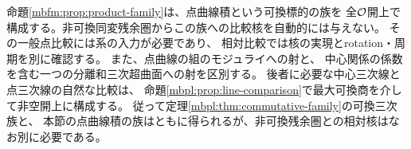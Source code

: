 \begin{remark}[点曲線積と残余比較]
\label{mbfm:rem:comparison-boundary}
命題\ref{mbfm:prop:product-family}は、点曲線積という可換標的の族を
全$\mathcal O$開上で構成する。非可換同変残余圏からこの族への比較核を自動的には与えない。
その一般点比較には系の入力が必要であり、
相対比較では核の実現とrotation・周期を別に確認する。
また、点曲線の組のモジュライへの射と、
中心関係の係数を含む一つの分離和三次超曲面への射を区別する。
後者に必要な中心三次線と点三次線の自然な比較は、
命題\ref{mbpl:prop:line-comparison}で最大可換商を介して非空開上に構成する。
従って定理\ref{mbpl:thm:commutative-family}の可換三次族と、
本節の点曲線積の族はともに得られるが、非可換残余圏との相対核はなお別に必要である。
\end{remark}
